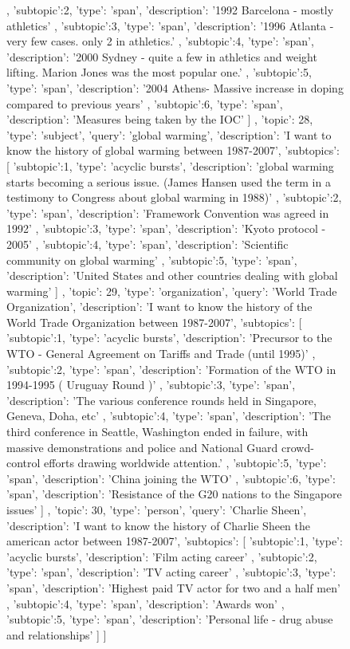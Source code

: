 \begin{figure}[ht]
{\begin{minipage}{\textwidth}
{{			},
			{
				'subtopic':2,
				'type': 'span',
				'description': '1992 Barcelona - mostly athletics'
			},{
				'subtopic':3,
				'type': 'span',
				'description': '1996 Atlanta - very few cases. only 2 in athletics.'
			},
			{
				'subtopic':4,
				'type': 'span',
				'description': '2000 Sydney - quite a few in athletics and weight lifting. Marion Jones was the most popular one.'
			},
			{
				'subtopic':5,
				'type': 'span',
				'description': '2004 Athens- Massive increase in doping compared to previous years'
			},
			{
				'subtopic':6,
				'type': 'span',
				'description': 'Measures being taken by the IOC'
			}
		]
	},
	{		
		'topic': 28,
		'type': 'subject',
		'query': 'global warming',
		'description': 'I want to know the history of global warming between 1987-2007',
		'subtopics': [
			{
				'subtopic':1,
				'type': 'acyclic bursts',
				'description': 'global warming starts becoming a serious issue. (James Hansen used the term in a testimony to Congress about global warming in 1988)'
			},
			{
				'subtopic':2,
				'type': 'span',
				'description': 'Framework Convention was agreed in 1992'
			},{
				'subtopic':3,
				'type': 'span',
				'description': 'Kyoto protocol - 2005'
			},
			{
				'subtopic':4,
				'type': 'span',
				'description': 'Scientific community on global warming'
			},
			{
				'subtopic':5,
				'type': 'span',
				'description': 'United States and other countries dealing with global warming'
			}
		]
	},
	{		
		'topic': 29,
		'type': 'organization',
		'query': 'World Trade Organization',
		'description': 'I want to know the history of the World Trade Organization between 1987-2007',
		'subtopics': [
			{
				'subtopic':1,
				'type': 'acyclic bursts',
				'description': 'Precursor to the WTO - General Agreement on Tariffs and Trade (until 1995)'
			},
			{
				'subtopic':2,
				'type': 'span',
				'description': 'Formation of the WTO in 1994-1995 ( Uruguay Round )'
			},{
				'subtopic':3,
				'type': 'span',
				'description': 'The various conference rounds held in Singapore, Geneva, Doha, etc'
			},
			{
				'subtopic':4,
				'type': 'span',
				'description': 'The third conference in Seattle, Washington ended in failure, with massive demonstrations and police and National Guard crowd-control efforts drawing worldwide attention.'
			},
			{
				'subtopic':5,
				'type': 'span',
				'description': 'China joining the WTO'
			},
			{
				'subtopic':6,
				'type': 'span',
				'description': 'Resistance of the G20 nations to the Singapore issues'
			}
		]
	},
	{		
		'topic': 30,
		'type': 'person',
		'query': 'Charlie Sheen',
		'description': 'I want to know the history of Charlie Sheen the american actor between 1987-2007',
		'subtopics': [
			{
				'subtopic':1,
				'type': 'acyclic bursts',
				'description': 'Film acting career'
			},
			{
				'subtopic':2,
				'type': 'span',
				'description': 'TV acting career'
			},
			{
				'subtopic':3,
				'type': 'span',
				'description': 'Highest paid TV actor for two and a half men'
			},
			{
				'subtopic':4,
				'type': 'span',
				'description': 'Awards won'
			},
			{
				'subtopic':5,
				'type': 'span',
				'description': 'Personal life - drug abuse and relationships'
			}
		]
	}
]


\end{minipage}}
\end{figure}
